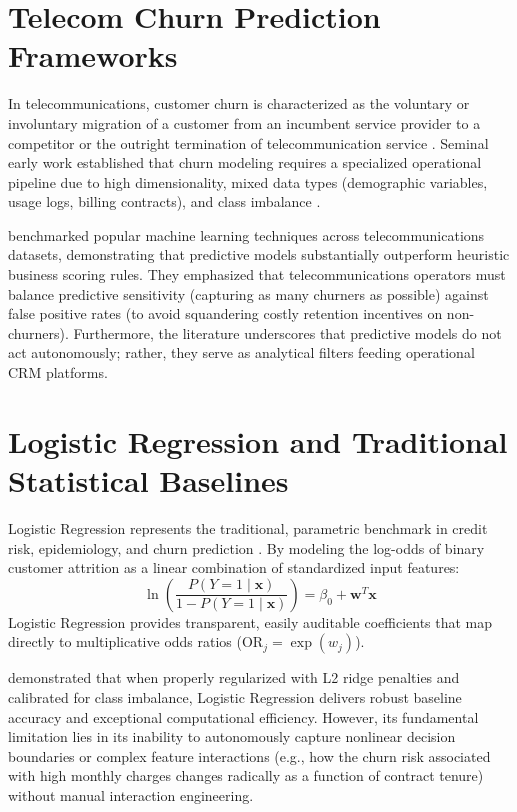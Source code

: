 \documentclass[12pt,a4paper]{report}
\begin{document}
\section{Telecom Churn Prediction Frameworks}
In telecommunications, customer churn is characterized as the voluntary or involuntary migration of a customer from an incumbent service provider to a competitor or the outright termination of telecommunication service \citep{verbeke2012building}. Seminal early work established that churn modeling requires a specialized operational pipeline due to high dimensionality, mixed data types (demographic variables, usage logs, billing contracts), and class imbalance \citep{coussement2008churn}. 

\citet{vafeiadis2015comparison} benchmarked popular machine learning techniques across telecommunications datasets, demonstrating that predictive models substantially outperform heuristic business scoring rules. They emphasized that telecommunications operators must balance predictive sensitivity (capturing as many churners as possible) against false positive rates (to avoid squandering costly retention incentives on non-churners). Furthermore, the literature underscores that predictive models do not act autonomously; rather, they serve as analytical filters feeding operational CRM platforms.

\section{Logistic Regression and Traditional Statistical Baselines}
Logistic Regression represents the traditional, parametric benchmark in credit risk, epidemiology, and churn prediction \citep{hastie2009elements}. By modeling the log-odds of binary customer attrition as a linear combination of standardized input features:
\begin{equation}
    \ln\left(\frac{P(Y=1 \mid \mathbf{x})}{1 - P(Y=1 \mid \mathbf{x})}\right) = \beta_0 + \mathbf{w}^T \mathbf{x}
\end{equation}
Logistic Regression provides transparent, easily auditable coefficients that map directly to multiplicative odds ratios ($\text{OR}_j = \exp(w_j)$). 

\citet{coussement2008churn} demonstrated that when properly regularized with L2 ridge penalties and calibrated for class imbalance, Logistic Regression delivers robust baseline accuracy and exceptional computational efficiency. However, its fundamental limitation lies in its inability to autonomously capture nonlinear decision boundaries or complex feature interactions (e.g., how the churn risk associated with high monthly charges changes radically as a function of contract tenure) without manual interaction engineering.
\end{document}

